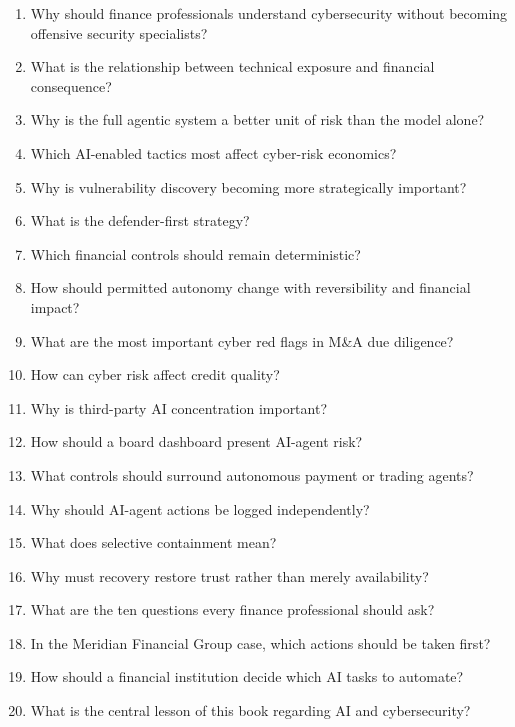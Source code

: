 \begin{enumerate}
    \item Why should finance professionals understand cybersecurity without becoming offensive security specialists?
    \item What is the relationship between technical exposure and financial consequence?
    \item Why is the full agentic system a better unit of risk than the model alone?
    \item Which AI-enabled tactics most affect cyber-risk economics?
    \item Why is vulnerability discovery becoming more strategically important?
    \item What is the defender-first strategy?
    \item Which financial controls should remain deterministic?
    \item How should permitted autonomy change with reversibility and financial impact?
    \item What are the most important cyber red flags in M\&A due diligence?
    \item How can cyber risk affect credit quality?
    \item Why is third-party AI concentration important?
    \item How should a board dashboard present AI-agent risk?
    \item What controls should surround autonomous payment or trading agents?
    \item Why should AI-agent actions be logged independently?
    \item What does selective containment mean?
    \item Why must recovery restore trust rather than merely availability?
    \item What are the ten questions every finance professional should ask?
    \item In the Meridian Financial Group case, which actions should be taken first?
    \item How should a financial institution decide which AI tasks to automate?
    \item What is the central lesson of this book regarding AI and cybersecurity?
\end{enumerate}
